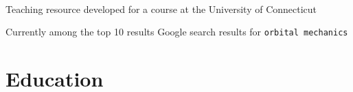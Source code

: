 \\
\begin{tightemize}
\item Teaching resource developed for a course at the University of Connecticut
\item Currently among the top 10 results Google search results for \verb|orbital mechanics|
\end{tightemize}
\sectionsep




\section{Education}



\sectionsep


